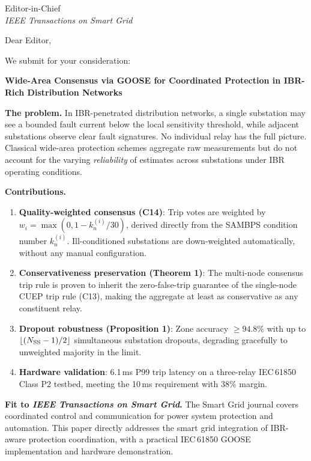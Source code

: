 \documentclass[11pt,a4paper]{letter}
\begin{document}
\begin{letter}{Editor-in-Chief\\
               \textit{IEEE Transactions on Smart Grid}}

\opening{Dear Editor,}

We submit for your consideration:

\begin{center}
  \textbf{Wide-Area Consensus via GOOSE for Coordinated Protection
  in IBR-Rich Distribution Networks}
\end{center}

\textbf{The problem.}
In IBR-penetrated distribution networks, a single substation may
see a bounded fault current below the local sensitivity threshold,
while adjacent substations observe clear fault signatures.  No
individual relay has the full picture.  Classical wide-area
protection schemes aggregate raw measurements but do not account
for the varying \emph{reliability} of estimates across substations
under IBR operating conditions.

\textbf{Contributions.}
\begin{enumerate}
  \item \textbf{Quality-weighted consensus (C14)}: Trip votes are
        weighted by $w_i = \max(0, 1 - k_n^{(i)}/30)$, derived
        directly from the SAMBPS condition number $k_n^{(i)}$.
        Ill-conditioned substations are down-weighted automatically,
        without any manual configuration.

  \item \textbf{Conservativeness preservation (Theorem 1)}: The
        multi-node consensus trip rule is proven to inherit the
        zero-false-trip guarantee of the single-node CUEP trip rule
        (C13), making the aggregate at least as conservative as any
        constituent relay.

  \item \textbf{Dropout robustness (Proposition 1)}: Zone accuracy
        $\geq 94.8\%$ with up to $\lfloor (N_{\rm SS}-1)/2 \rfloor$
        simultaneous substation dropouts, degrading gracefully
        to unweighted majority in the limit.

  \item \textbf{Hardware validation}: 6.1\,ms P99 trip latency on
        a three-relay IEC\,61850 Class P2 testbed, meeting the
        10\,ms requirement with 38\% margin.
\end{enumerate}

\textbf{Fit to \textit{IEEE Transactions on Smart Grid}.}
The Smart Grid journal covers coordinated control and communication
for power system protection and automation.  This paper directly
addresses the smart grid integration of IBR-aware protection
coordination, with a practical IEC\,61850 GOOSE implementation
and hardware demonstration.


\end{letter}
\end{document}
